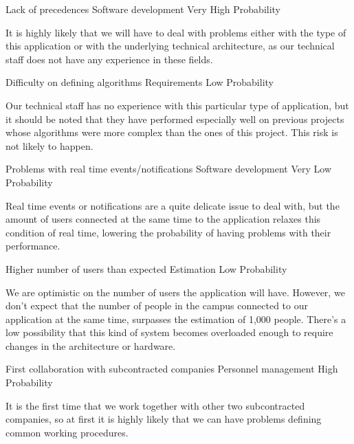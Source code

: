 \begin{risk}[riskPrec]{Lack of precedences}
\riskcat Software development
 Very High Probability

It is highly likely that we will have to deal with problems either with the type of this application or with the underlying technical architecture, as our technical staff does not have any experience in these fields.
\end{risk}

\begin{risk}[riskAlgorithms]{Difficulty on defining algorithms}
\riskcat Requirements
 Low Probability

Our technical staff has no experience with this particular type of application, but it should be noted that they have performed especially well on previous projects whose algorithms were more complex than the ones of this project. This risk is not likely to happen.
\end{risk}

\begin{risk}[riskRealTime]{Problems with real time events/notifications}
\riskcat Software development
 Very Low Probability

Real time events or notifications are a quite delicate issue to deal with, but the amount of users connected at the same time to the application relaxes this condition of real time, lowering the probability of having problems with their performance.
\end{risk}

\begin{risk}[riskUserLoad]{Higher number of users than expected}
\riskcat Estimation
 Low Probability

We are optimistic on the number of users the application will have. However, we don't expect that the number of people in the campus connected to our application at the same time, surpasses the estimation of 1,000 people. There's a low possibility that this kind of system becomes overloaded enough to require changes in the architecture or hardware.
\end{risk}

\begin{risk}[riskCollaboration]{First collaboration with subcontracted companies}
\riskcat Personnel management
 High Probability

It is the first time that we work together with other two subcontracted companies, so at first it is highly likely that we can have problems defining common working procedures.
\end{risk}

